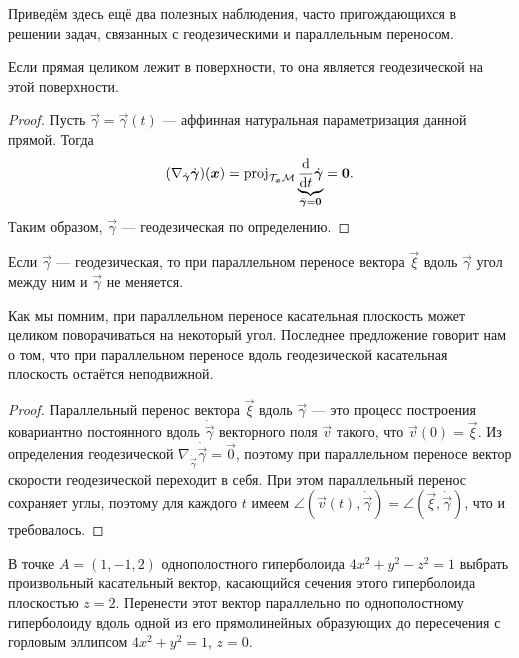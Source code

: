 Приведём здесь ещё два полезных наблюдения, часто пригождающихся в решении задач, связанных с геодезическими и параллельным переносом.

\begin{proposition} \label{proposition:StraightGeodesic}
	Если прямая целиком лежит в поверхности, то она является геодезической на этой поверхности.
\end{proposition}

\begin{proof}
	Пусть $\vec{\gamma} = \vec{\gamma}(t)$ --- аффинная натуральная параметризация данной прямой. Тогда
	\[
		(\nabla_{\dot{\boldsymbol{\gamma}}}\dot{\boldsymbol{\gamma}})(\boldsymbol{x}) = \operatorname{proj}_{\mathcal{T}_{\boldsymbol{x}}\mathcal{M}}\underbrace{\frac{\mathop{}\!\mathrm{d}}{\mathop{}\!\mathrm{d} t}\dot{\boldsymbol{\gamma}}}_{\ddot{\boldsymbol{\gamma}} = \boldsymbol{0}} = \boldsymbol{0}.
	\]
	Таким образом, $\vec{\gamma}$ --- геодезическая по определению.
\end{proof}

\begin{proposition} \label{proposition:GeodesicParallel}
	Если $\vec{\gamma}$ --- геодезическая, то при параллельном переносе вектора $\vec{\xi}$ вдоль $\vec{\gamma}$ угол между ним и $\vec{\gamma}$ не меняется.
\end{proposition}

Как мы помним, при параллельном переносе касательная плоскость может целиком поворачиваться на некоторый угол. Последнее предложение говорит нам о том, что при параллельном переносе вдоль геодезической касательная плоскость остаётся неподвижной.

\begin{proof}
	Параллельный перенос вектора $\vec{\xi}$ вдоль $\vec{\gamma}$ --- это процесс построения ковариантно постоянного вдоль $\dot{\vec{\gamma}}$ векторного поля $\vec{v}$ такого, что $\vec{v}(0) = \vec{\xi}$. Из определения геодезической $\nabla_{\dot{\vec{\gamma}}}\dot{\vec{\gamma}} = \vec{0}$, поэтому при параллельном переносе вектор скорости геодезической переходит в себя. При этом параллельный перенос сохраняет углы, поэтому для каждого $t$ имеем $\angle(\vec{v}(t), \dot{\vec{\gamma}}) = \angle(\vec{\xi}, \dot{\vec{\gamma}})$, что и требовалось.
\end{proof}

\begin{problem}
	В точке $A = (1, -1, 2)$ однополостного гиперболоида $4x^2 + y^2 - z^2 = 1$ выбрать произвольный касательный вектор, касающийся сечения этого гиперболоида плоскостью $z = 2$. Перенести этот вектор параллельно по однополостному гиперболоиду вдоль одной из его прямолинейных образующих до пересечения с горловым эллипсом $4x^2 + y^2 = 1$, $z = 0$.
\end{problem}

